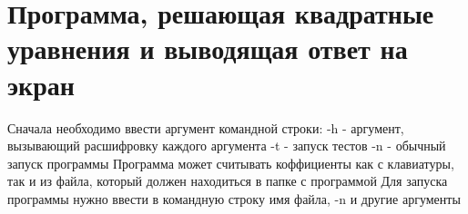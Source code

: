 \chapter{Программа, решающая квадратные уравнения и выводящая ответ на экран}
\hypertarget{index}{}\label{index}
Сначала необходимо ввести аргумент командной строки\+: -\/h -\/ аргумент, вызывающий расшифровку каждого аргумента -\/t -\/ запуск тестов -\/n -\/ обычный запуск программы Программа может считывать коффициенты как с клавиатуры, так и из файла, который должен находиться в папке с программой Для запуска программы нужно ввести в командную строку имя файла, -\/n и другие аргументы 